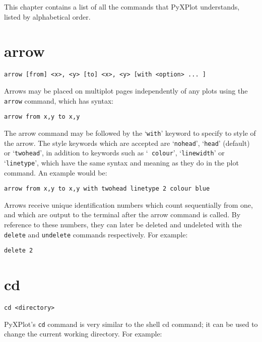\documentclass[a4paper,onecolumn,11pt]{book}
\begin{document}
This chapter contains a list of all the commands that PyXPlot understands,
listed by alphabetical order.

\section{arrow}

\begin{verbatim}
arrow [from] <x>, <y> [to] <x>, <y> [with <option> ... ]
\end{verbatim}

Arrows may be placed on multiplot pages independently of any plots using the
{\tt arrow} command, which has syntax:

\begin{verbatim}
arrow from x,y to x,y
\end{verbatim}

The arrow command may be followed by the `{\tt with}' keyword to specify to
style of the arrow. The style keywords which are accepted are `{\tt nohead}',
`{\tt head}' (default) or `{\tt twohead}', in addition to keywords such as `{\tt
colour}', `{\tt linewidth}' or `{\tt linetype}', which have the same syntax and
meaning as they do in the plot command. An example would be:

\begin{verbatim}
arrow from x,y to x,y with twohead linetype 2 colour blue
\end{verbatim}

Arrows receive unique identification numbers which count sequentially from one,
and which are output to the terminal after the arrow command is called. By
reference to these numbers, they can later be deleted and undeleted with the
{\tt delete} and {\tt undelete} commands respectively. For example:

\begin{verbatim}
delete 2
\end{verbatim}

\section{cd}

\begin{verbatim}
cd <directory>
\end{verbatim}

PyXPlot's {\tt cd} command is very similar to the shell cd command; it can be used to
change the current working directory. For example:
\end{document}
